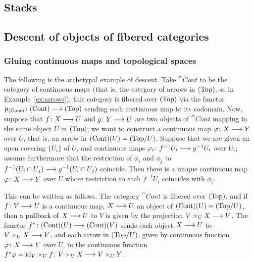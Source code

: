 \begin{4   STACKS}
\setcounter{chapter}{3}
\chapter{Stacks}\label{ch:stacks}
\begin{4.1 Descent of objects of fibcats}
\setcounter{section}{0}
\section{Descent of objects of fibered categories}

\subsection{Gluing continuous maps and topological spaces}

The  following is the archetypal example of descent.
Take $\cat{Cont}$ to be the category of continuous maps (that is, the category of arrows in $(\mathrm{Top})$, as in Example~\ref{ex:arrows}); this category is fibered over $(\mathrm{Top})$ via the functor $\p_{\cat{Cont}} \colon \cat{Cont} \arr \cattop$ sending each continuous map to its codomain. Now, suppose that $f \colon X \arr U$ and $g \colon Y \arr U$ are two objects of $\cat{Cont}$ mapping to the same object $U$ in $(\mathrm{Top})$; we want to construct a continuous map $\phi\colon X \arr Y$ over $U$, that is, an arrow in $(\mathrm{Cont})(U) = ({\mathrm{Top}/U})$. Suppose that we are given an open covering $\{U_i\}$ of $U$, and continuous maps $\phi_i \colon f^{-1} U_i \arr g^{-1} U_i$ over $U_i$; assume furthermore that the restriction of $\phi_i$ and $\phi_j$ to $f ^{-1}(U_i \cap U_j) \arr g^{-1}(U_i \cap U_j)$ coincide. Then there is a unique continuous map $\phi \colon X \arr Y$ over $U$ whose restriction to each $f^{-1}U_i$ coincides with $\phi_i$.

This can be written as follows. The category $\cat{Cont}$ is fibered over $(\mathrm{Top})$, and if $f\colon V \arr U$ is a continuous map, $X \arr U$ an object of $(\mathrm{Cont}) (U) = ({\mathrm{Top}/U})$, then a pullback of $X \arr U$ to $V$ is given by the projection $V \times_U X \arr V$. The functor $f^* \colon \cat{Cont}(U) \arr \cat{Cont}(V)$ sends each object $X \arr U$ to $V \times_U X \arr V$, and each arrow in $({\mathrm{Top}/U})$, given by  continuous function $\phi\colon X \arr Y$ over $U$, to the continuous function $f^* \phi = \id_V \times_U f \colon V \times_U X \arr V \times_U Y$. 


\end{4.1 Descent of objects of fibcats}
\end{4   STACKS}

